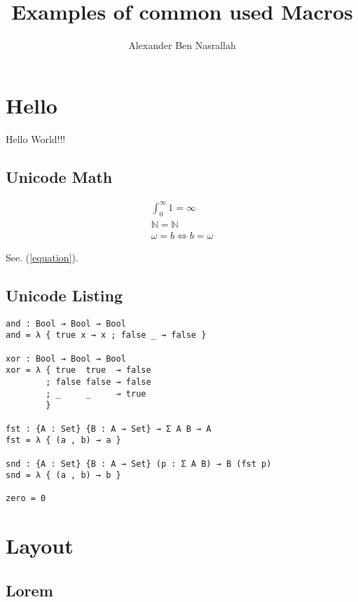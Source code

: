 \documentclass[titlepage]{article}
\author{Alexander Ben Nasrallah}
\title{Examples of common used Macros}
\begin{document}
\maketitle


\toc{}

\section{Hello}
Hello World!!!

\subsection{Unicode Math}
\begin{align}
	∫_0^∞ 1 = ∞ \\
	\mathbb{N} = ℕ \label{equation}\\
	ω = b ⇔ b = ω
\end{align}

See. (\ref{equation}).

\subsection{Unicode Listing}
\begin{lstlisting}
and : Bool → Bool → Bool
and = λ { true x → x ; false _ → false }

xor : Bool → Bool → Bool
xor = λ { true  true  → false
        ; false false → false
        ; _     _     → true
        }

fst : {A : Set} {B : A → Set} → Σ A B → A
fst = λ { (a , b) → a }

snd : {A : Set} {B : A → Set} (p : Σ A B) → B (fst p)
snd = λ { (a , b) → b }

zero = 0
\end{lstlisting}

\section{Layout}
\subsection{Lorem}
\lipsum[2-4]
\end{document}
